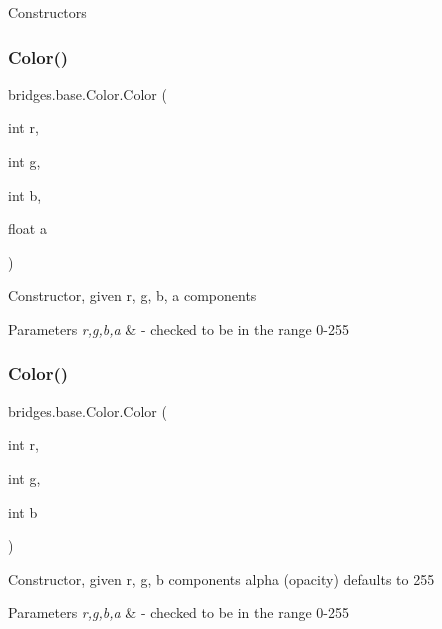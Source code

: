 Constructors \mbox{\label{classbridges_1_1base_1_1_color_a15f56590ca3c9cc161c7bfa47060ad21}} 
\subsubsection{\texorpdfstring{Color()}{Color()}\hspace{0.1cm}{\footnotesize\ttfamily [2/4]}}
{\footnotesize\ttfamily bridges.\+base.\+Color.\+Color (\begin{DoxyParamCaption}\item[{int}]{r,  }\item[{int}]{g,  }\item[{int}]{b,  }\item[{float}]{a }\end{DoxyParamCaption})}

Constructor, given r, g, b, a components


\begin{DoxyParams}{Parameters}
{\em r,g,b,a} & -\/ checked to be in the range 0-\/255 \\
\hline
\end{DoxyParams}
\mbox{\label{classbridges_1_1base_1_1_color_a5fab564fa4eec8bece64f847ebd42948}} 
\subsubsection{\texorpdfstring{Color()}{Color()}\hspace{0.1cm}{\footnotesize\ttfamily [3/4]}}
{\footnotesize\ttfamily bridges.\+base.\+Color.\+Color (\begin{DoxyParamCaption}\item[{int}]{r,  }\item[{int}]{g,  }\item[{int}]{b }\end{DoxyParamCaption})}

Constructor, given r, g, b components alpha (opacity) defaults to 255


\begin{DoxyParams}{Parameters}
{\em r,g,b,a} & -\/ checked to be in the range 0-\/255 \\
\hline
\end{DoxyParams}
\mbox{\label{classbridges_1_1base_1_1_color_a5cb17fdf8eddf44fc0763ceb7d4d833b}} 
